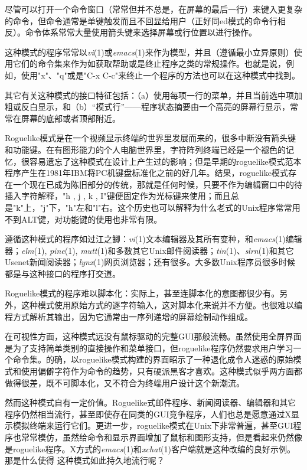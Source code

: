 \documentclass[12pt,oneside]{book}
\begin{document}
尽管可以打开一个命令窗口（常常但并不总是，在屏幕的最后一行）来键入更复杂的命令，但命令通常是单键触发而且不回显给用户（正好同ed模式的命令行相反）。命令体系常常大量使用箭头键来选择屏幕或行位置以进行操作。

这种模式的程序常常以\textit{vi}(1)或\textit{emacs}(1)来作为模型，并且（遵循最小立异原则）使用它们的命令集来作为如获取帮助或是终止程序之类的常规操作。也就是说，例如，使用"x"、"q"或是"C-x C-c"来终止一个程序的方法也可以在这种模式中找到。

其它有关这种模式的接口特征包括：（a）使用每项一行的菜单，并且当前选中项加粗或反白显示，和（b）“模式行”——程序状态摘要由一个高亮的屏幕行显示，常常在屏幕的底部或者顶部附近。

Roguelike模式是在一个视频显示终端的世界里发展而来的，很多中断没有箭头键和功能键。在有图形能力的个人电脑世界里，字符阵列终端已经是一个褪色的记忆，很容易遗忘了这种模式在设计上产生过的影响；但是早期的roguelike模式范本程序产生在1981年IBM将PC机键盘标准化之前的好几年。结果，roguelike模式存在一个现在已成为陈旧部分的传统，那就是任何时候，只要不作为编辑窗口中的待插入字符解释，"h , j , k , I"键便固定作为光标键来使用；而且总是"k"上，"j"下，"h"左和"l"右。这个历史也可以解释为什么老式的Unix程序常常用不到ALT键，对功能键的使用也非常有限。

遵循这种模式的程序如过江之鲫：\textit{vi}(1)文本编辑器及其所有变种，和\textit{emacs}(1)编辑器；\textit{elm}(1), \textit{pine}(1), \textit{mutt}(1)和多数其它Unix邮件阅读器；\textit{tin}(1)、\textit{slrn}(1)和其它Usenet新闻阅读器；\textit{lynx}(1)网页浏览器；还有很多。大多数Unix程序员很多时候都是与这种接口的程序打交道。

Roguelike模式的程序难以脚本化：实际上，甚至连脚本化的意图都很少有。另外，这种模式使用原始方式的逐字符输入，这对脚本化来说并不方便。也很难以编程方式解析其输出，因为它通常由一序列递增的屏幕绘制动作组成。

在可视性方面，这种模式远没有鼠标驱动的完整GUI那般流畅。虽然使用全屏界面是为了支持简单类别的直接操作和菜单接口，但roguelike程序仍然要求用户学习一个命令集。的确，以roguelike模式构建的界面昭示了一种退化成令人迷惑的原始模式和使用偏僻字符作为命令的趋势，只有硬派黑客才喜欢。这种模式似乎两方面都做得很差，既不可脚本化，又不符合为终端用户设计这个新潮流。

然而这种模式自有一定价值。Roguelike式邮件程序、新闻阅读器、编辑器和其它程序仍然相当流行，甚至即使存在同类的GUI竞争程序，人们也总是愿意通过X显示模拟终端来运行它们。更进一步，roguelike模式在Unix下非常普遍，甚至GUI程序也常常模仿，虽然给命令和显示界面增加了鼠标和图形支持，但是看起来仍然像是roguelike程序。X方式的\textit{emacs}(1)和\textit{xchat}(1)客户端就是这种改编的良好示例。那是什么使得
这种模式如此持久地流行呢？
\end{document}
